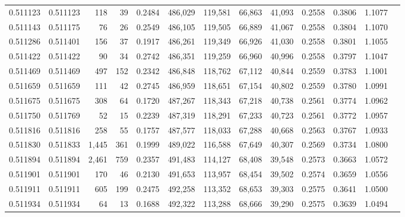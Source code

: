 \begin{tabular}{rrrrrrrrrrrrr}
0.511123 & 0.511123 &   118 &    39 &                                     0.2484 & 486,029 & 119,581 &  66,863 &  41,093 & 0.2558 & 0.3806 & 1.1077 \\
0.511143 & 0.511175 &    76 &    26 &                                     0.2549 & 486,105 & 119,505 &  66,889 &  41,067 & 0.2558 & 0.3804 & 1.1070 \\
0.511286 & 0.511401 &   156 &    37 &                                     0.1917 & 486,261 & 119,349 &  66,926 &  41,030 & 0.2558 & 0.3801 & 1.1055 \\
0.511422 & 0.511422 &    90 &    34 &                                     0.2742 & 486,351 & 119,259 &  66,960 &  40,996 & 0.2558 & 0.3797 & 1.1047 \\
0.511469 & 0.511469 &   497 &   152 &                                     0.2342 & 486,848 & 118,762 &  67,112 &  40,844 & 0.2559 & 0.3783 & 1.1001 \\
0.511659 & 0.511659 &   111 &    42 &                                     0.2745 & 486,959 & 118,651 &  67,154 &  40,802 & 0.2559 & 0.3780 & 1.0991 \\
0.511675 & 0.511675 &   308 &    64 &                                     0.1720 & 487,267 & 118,343 &  67,218 &  40,738 & 0.2561 & 0.3774 & 1.0962 \\
0.511750 & 0.511769 &    52 &    15 &                                     0.2239 & 487,319 & 118,291 &  67,233 &  40,723 & 0.2561 & 0.3772 & 1.0957 \\
0.511816 & 0.511816 &   258 &    55 &                                     0.1757 & 487,577 & 118,033 &  67,288 &  40,668 & 0.2563 & 0.3767 & 1.0933 \\
0.511830 & 0.511833 & 1,445 &   361 &                                     0.1999 & 489,022 & 116,588 &  67,649 &  40,307 & 0.2569 & 0.3734 & 1.0800 \\
0.511894 & 0.511894 & 2,461 &   759 &                                     0.2357 & 491,483 & 114,127 &  68,408 &  39,548 & 0.2573 & 0.3663 & 1.0572 \\
0.511901 & 0.511901 &   170 &    46 &                                     0.2130 & 491,653 & 113,957 &  68,454 &  39,502 & 0.2574 & 0.3659 & 1.0556 \\
0.511911 & 0.511911 &   605 &   199 &                                     0.2475 & 492,258 & 113,352 &  68,653 &  39,303 & 0.2575 & 0.3641 & 1.0500 \\
0.511934 & 0.511934 &    64 &    13 &                                     0.1688 & 492,322 & 113,288 &  68,666 &  39,290 & 0.2575 & 0.3639 & 1.0494 \\

\end{tabular}
